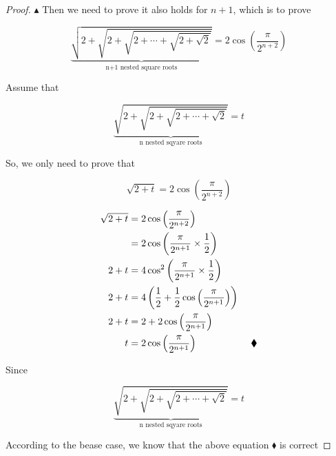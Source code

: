 \documentclass[12pt]{article}
\begin{document}
\begin{proof}
    \vspace*{0.3cm}
    \hspace*{1.2cm}
    $\blacktriangle$ Then we need to prove it also holds for $n+1$, which is to prove

    \[ \underbrace{\sqrt{2+\sqrt{2+\sqrt{2+\cdots + \sqrt{2 + \sqrt{2}}}}} }
    _\text{n+1 nested square roots} = 2\cos
    \left(  \frac{\pi}{2^{n+2}}  \right) \]

    \vspace*{0.3cm}
    \hspace*{1.2cm}
    Assume that 

    \[  \underbrace{\sqrt{2+\sqrt{2+\sqrt{2+\cdots + \sqrt{2 }}}}}_\text{
        n nested sqyare roots} = t
    \] 

    \vspace*{0.3cm}
    \hspace*{1.2cm}
    So, we only need to prove that

    \[ \sqrt{2 + t} = 2\cos{\left( \frac{\pi}{2^{n+2}} \right) } \]

    \newpage
    
    \begin{align*}
        \sqrt{2 + t}  & = 2\cos{\left( \frac{\pi}{2^{n+2}} \right) } \\
        & = 2 \cos{\left( \frac{\pi}{2^{n+1 }} \times \frac{1}{2}  \right)} \\
        2 + t & = 4 \cos^{2}{\left( \frac{\pi}{2^{n+1}} \times \frac{1}{2} \right)} \\
        2 + t & = 4 \left(  \frac{1}{2} + \frac{1}{2} \cos{\left( \frac{\pi}{2^{n+1}} \right)} \right) \\
        2 + t & = 2 + 2\cos{\left( \frac{\pi}{2^{n+1}}\right)} \\
        t & = 2\cos{\left( \frac{\pi}{2^{n+1}}\right)} \hspace*{2cm} \blacklozenge
    \end{align*}

    \vspace*{0.3cm}
    \hspace*{1.2cm}
    Since 

    \[  \underbrace{\sqrt{2+\sqrt{2+\sqrt{2+\cdots + \sqrt{2 }}}}}_\text{
        n nested sqyare roots} = t
    \] 

    \vspace*{0.3cm}
    \hspace*{1.2cm}
    According to the bease case, we know that the above equation $\blacklozenge$ is correct


\end{proof}
\end{document}

